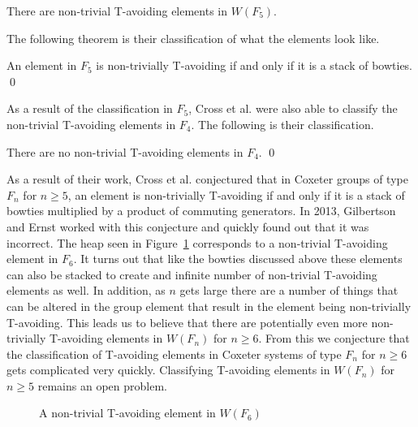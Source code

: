 \begin{theorem}
There are non-trivial T-avoiding elements in $W(F_5)$.	
\end{theorem}

The following theorem is their classification of what the elements look like.

\begin{theorem}
An element in $F_5$ is non-trivially T-avoiding if and only if it is a stack of bowties. \qed	
\end{theorem}

As a result of the classification in $F_5$, Cross et al. were also able to classify the non-trivial T-avoiding elements in $F_4$. The following is their classification.

\begin{corollary}
There are no non-trivial T-avoiding elements in $F_4$. \qed	
\end{corollary}

As a result of their work, Cross et al. conjectured that in Coxeter groups of type $F_n$ for $n \geq 5$, an element is non-trivially T-avoiding if and only if it is a stack of bowties multiplied by a product of commuting generators. In 2013, Gilbertson and Ernst worked with this conjecture and quickly found out that it was incorrect. The heap seen in Figure~\ref{fig:f6bat} corresponds to a non-trivial T-avoiding element in $F_6$. It turns out that like the bowties discussed above these elements can also be stacked to create and infinite number of non-trivial T-avoiding elements as well. In addition, as $n$ gets large there are a number of things that can be altered in the group element that result in the element being non-trivially T-avoiding. This leads us to believe that there are potentially even more non-trivially T-avoiding elements in $W(F_n)$ for $n \geq 6$. From this we conjecture that the classification of T-avoiding elements in Coxeter systems of type $F_n$ for $n \geq 6$ gets complicated very quickly. Classifying T-avoiding elements in $W(F_n)$ for $n \geq 5$ remains an open problem. 

\begin{figure}[h!]\centering
{}
\caption{A non-trivial T-avoiding element in $W(F_6)$}\label{fig:f6bat}
\end{figure}

